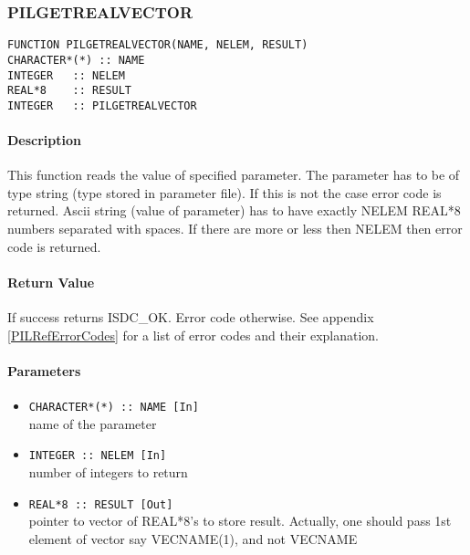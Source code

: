 
\subsubsection{PILGETREALVECTOR}

\begin{verbatim}
FUNCTION PILGETREALVECTOR(NAME, NELEM, RESULT) 
CHARACTER*(*) :: NAME 
INTEGER   :: NELEM
REAL*8    :: RESULT 
INTEGER   :: PILGETREALVECTOR
\end{verbatim}

\paragraph{Description\\}
This function reads the value of specified parameter. The parameter has
to be of type string (type stored in parameter file). If this is not the
case error code is returned. Ascii string (value of parameter) has to have
exactly NELEM REAL*8 numbers separated with spaces. If there are more
or less then NELEM then error code is returned.

\paragraph{Return Value\\}
If success returns ISDC\_OK. Error code otherwise. See appendix \ref{PILRefErrorCodes}
for a list of error codes and their explanation.

\paragraph{Parameters}
\begin{itemize}
\item
{\tt CHARACTER*(*) :: NAME [In] } \\
name of the parameter 
\item
{\tt INTEGER   :: NELEM [In] } \\
number of integers to return
\item
{\tt REAL*8 :: RESULT [Out] } \\
pointer to vector of REAL*8's to store result. Actually, one should
pass 1st element of vector say VECNAME(1), and not VECNAME
\end{itemize}



